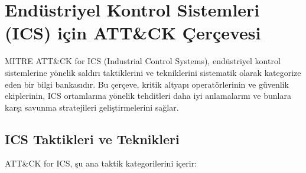 \section{Endüstriyel Kontrol Sistemleri (ICS) için ATT\&CK Çerçevesi}

MITRE ATT\&CK for ICS (Industrial Control Systems), endüstriyel kontrol sistemlerine yönelik saldırı taktiklerini ve tekniklerini sistematik olarak kategorize eden bir bilgi bankasıdır. Bu çerçeve, kritik altyapı operatörlerinin ve güvenlik ekiplerinin, ICS ortamlarına yönelik tehditleri daha iyi anlamalarını ve bunlara karşı savunma stratejileri geliştirmelerini sağlar.

\subsection{ICS Taktikleri ve Teknikleri}

ATT\&CK for ICS, şu ana taktik kategorilerini içerir:

